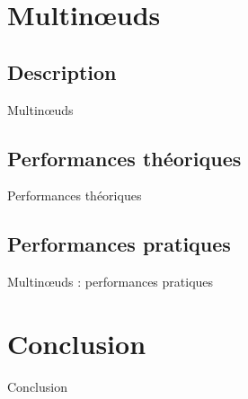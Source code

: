 \documentclass[9.5pt]{beamer}
\begin{document}
\section{Multin\oe{}uds}
	\subsection{Description}
		\begin{frame}{Multin\oe{}uds}

		\end{frame}

	\subsection{Performances théoriques}
		\begin{frame}{Performances théoriques}

		\end{frame}

	\subsection{Performances pratiques}

		\begin{frame}{Multin\oe{}uds : performances pratiques}

		\end{frame}

\section{Conclusion}
	\begin{frame}{Conclusion}

	\end{frame}
\end{document}
